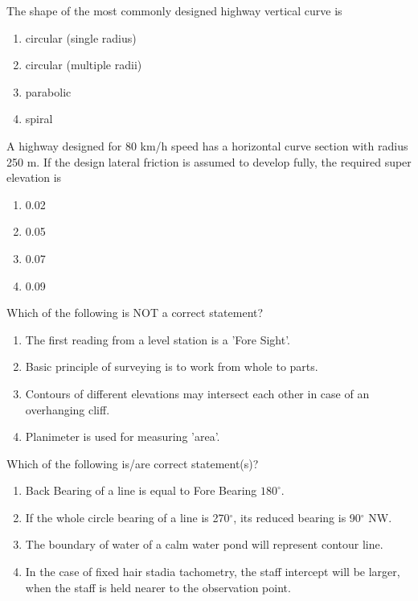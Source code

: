 \item The shape of the most commonly designed highway vertical curve is
\begin{enumerate}
\item circular (single radius)
\item circular (multiple radii)
\item parabolic
\item spiral
\end{enumerate}

\item A highway designed for 80 km/h speed has a horizontal curve section with radius 250 m. If the design lateral friction is assumed to develop fully, the required super elevation is
\begin{enumerate}
\item 0.02
\item 0.05
\item 0.07
\item 0.09
\end{enumerate} 

\item Which of the following is NOT a correct statement?
\begin{enumerate}
\item The first reading from a level station is a 'Fore Sight'.
\item Basic principle of surveying is to work from whole to parts.
\item Contours of different elevations may intersect each other in case of an overhanging cliff.
\item Planimeter is used for measuring 'area'.
\end{enumerate}


\item Which of the following is/are correct statement(s)?
\begin{enumerate}
\item Back Bearing of a line is equal to Fore Bearing $  180^\circ$.
\item If the whole circle bearing of a line is 270$^\circ$, its reduced bearing is 90$^\circ$ NW.
\item The boundary of water of a calm water pond will represent contour line.
\item In the case of fixed hair stadia tachometry, the staff intercept will be larger, when the staff is held nearer to the observation point.
\end{enumerate}

